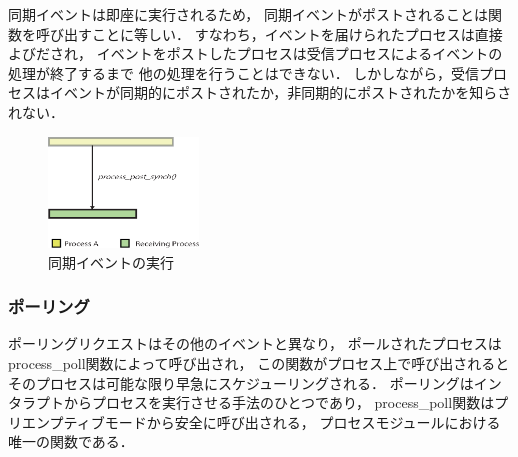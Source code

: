 同期イベントは即座に実行されるため，
同期イベントがポストされることは関数を呼び出すことに等しい．
すなわち，イベントを届けられたプロセスは直接よびだされ，
イベントをポストしたプロセスは受信プロセスによるイベントの処理が終了するまで
他の処理を行うことはできない．
しかしながら，受信プロセスはイベントが同期的にポストされたか，非同期的にポストされたかを知らされない．

\begin{figure}[htbp]
 \begin{center}
  \includegraphics[width=40mm]{./images/synchronous_event.eps}
 \end{center}
 \caption{同期イベントの実行}
 \label{fig:synchronous_event}
\end{figure}


\subsubsection{ポーリング}

\vspace{0.5em}ポーリングリクエストはその他のイベントと異なり，
ポールされたプロセスはprocess\_poll関数によって呼び出され，
この関数がプロセス上で呼び出されるとそのプロセスは可能な限り早急にスケジューリングされる．
ポーリングはインタラプトからプロセスを実行させる手法のひとつであり，
process\_poll関数はプリエンプティブモードから安全に呼び出される，
プロセスモジュールにおける唯一の関数である．




